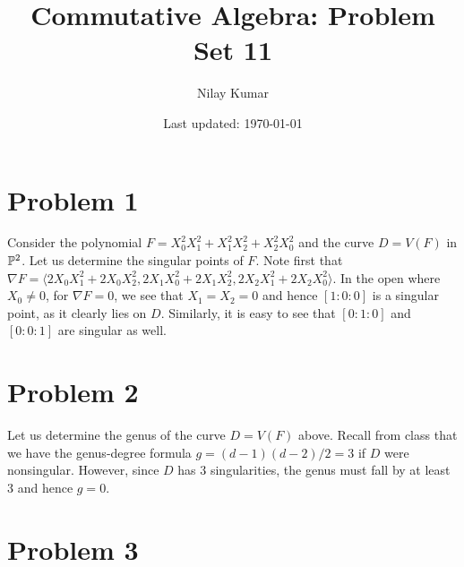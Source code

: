 \documentclass{../../mathnotes}
\title{Commutative Algebra: Problem Set 11}
\author{Nilay Kumar}
\date{Last updated: \today}
\begin{document}
\maketitle

\section*{Problem 1}

Consider the polynomial $F=X_0^2X_1^2+X_1^2X_2^2+X_2^2X_0^2$ and the curve $D=V(F)$ in $\mathbb{P}^2$.
Let us determine the singular points of $F$.
Note first that $\nabla F=\langle2X_0X_1^2+2X_0X_2^2,2X_1X_0^2+2X_1X_2^2,2X_2X_1^2+2X_2X_0^2\rangle$. In the
open where $X_0\neq0$, for $\nabla F=0$, we see that $X_1=X_2=0$ and hence $[1:0:0]$ is a singular point,
as it clearly lies on $D$. Similarly, it is easy to see that $[0:1:0]$ and $[0:0:1]$ are singular as well.

\section*{Problem 2}

Let us determine the genus of the curve $D=V(F)$ above. Recall from class that we have the genus-degree
formula $g=(d-1)(d-2)/2=3$ if $D$ were nonsingular. However, since $D$ has 3 singularities, the genus must
fall by at least 3 and hence $g=0$.

\section*{Problem 3}
\end{document}
